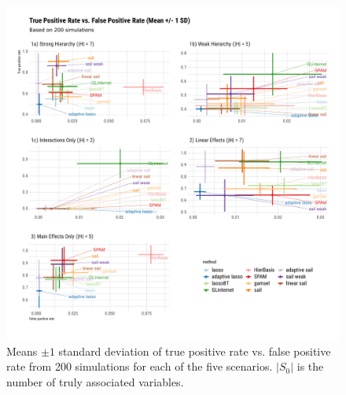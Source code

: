 \documentclass[12pt,letter]{article}\usepackage[]{graphicx}\usepackage[]{color}
\newenvironment{knitrout}{}{} %
\begin{document}
\begin{knitrout}\scriptsize
{}\color{fgcolor}\begin{figure}[H]

{\centering \includegraphics[width=1\linewidth]{figure/plot-tpr-fpr-sim-1} 

}

\caption[Means $\pm 1$ standard deviation of true positive rate vs]{Means $\pm 1$ standard deviation of true positive rate vs. false positive rate from 200 simulations for each of the five scenarios. $|S_0|$ is the number of truly associated variables.}\label{fig:plot-tpr-fpr-sim}
\end{figure}


\end{knitrout}
\end{document}

